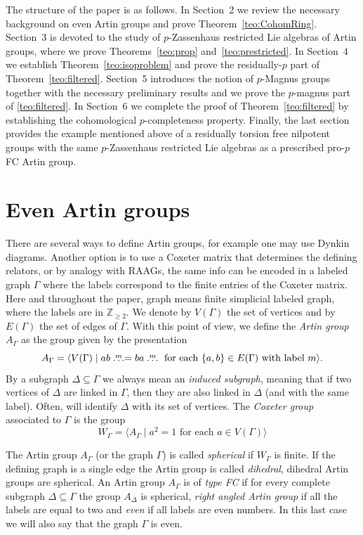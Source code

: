 \documentclass[10pt, oneside]{amsart}
\newcommand{\Z}{\mathbb{Z}} %
\theoremstyle{definition}
\theoremstyle{remark}
\theoremstyle{plain}
\begin{document}
The structure of the paper is as follows. In Section~2 we review the necessary background on even Artin groups and prove Theorem~\ref{teo:CohomRing}. Section~3 is devoted to the study of $p$-Zassenhaus restricted Lie algebras of Artin groups, where we prove Theorems~\ref{teo:prop} and~\ref{teo:prestricted}. In Section~4 we establish Theorem~\ref{teo:isoproblem} and prove the residually-$p$ part of Theorem~\ref{teo:filtered}. Section~5 introduces the notion of $p$-Magnus groups together with the necessary preliminary results and we prove the $p$-magnus part of \ref{teo:filtered}. In Section~6 we complete the proof of Theorem~\ref{teo:filtered} by establishing the cohomological $p$-completeness property. Finally, the last section provides the example mentioned above of a residually torsion free nilpotent groups with the same $p$-Zassenhaus restricted Lie algebras as a prescribed  pro-$p$ FC Artin group.

 

\section{Even Artin groups}\label{sec:Artin}

There are several ways to define Artin groups, for example one may use Dynkin diagrams. Another option is to use a Coxeter matrix that determines the defining relators, or by analogy with RAAGs, the same info can be encoded in a labeled graph $\Gamma$ where the labels correspond to the finite entries of the Coxeter matrix. Here and throughout the paper, graph means finite simplicial labeled graph, where the labels are in $\Z_{\geq 2}$. We denote by $V(\Gamma)$ the set of vertices and by $E(\Gamma)$ the set of edges of $\Gamma$. 
With this point of view, we define the {\sl Artin group} $A_\Gamma$ as the group given by the presentation
$$A_\Gamma=\langle V(\Gamma)\mid ab\buildrel{m}\over\ldots=ba\buildrel{m}\over\ldots\text{ for each }\{a,b\}\in E(\Gamma)\text{ with label }m\rangle.$$
By a subgraph $\Delta\subseteq\Gamma$ we always mean an {\sl induced subgraph}, meaning that if two vertices of $\Delta$ are linked in $\Gamma$, then they are also linked in $\Delta$ (and with the same label). Often, will identify $\Delta$ with its set of vertices. 
The {\sl Coxeter group} associated to $\Gamma$ is the group
$$W_\Gamma=\langle A_\Gamma\mid a^2=1\text{ for each }a\in V(\Gamma)\rangle$$

The Artin group $A_\Gamma$ (or the graph $\Gamma$) is called {\sl spherical} if $W_\Gamma$ is finite. If the defining graph is a single edge the Artin group is called {\sl dihedral}, dihedral Artin groups are spherical.
An Artin group $A_\Gamma$ is of {\sl type FC} if for every complete subgraph $\Delta\subseteq\Gamma$ the group $A_\Delta$ is spherical, {\sl right angled Artin group} if all the labels are equal to two and {\sl even} if all labels are even numbers. In this last case we will also say that the graph $\Gamma$ is even. 
\end{document}
